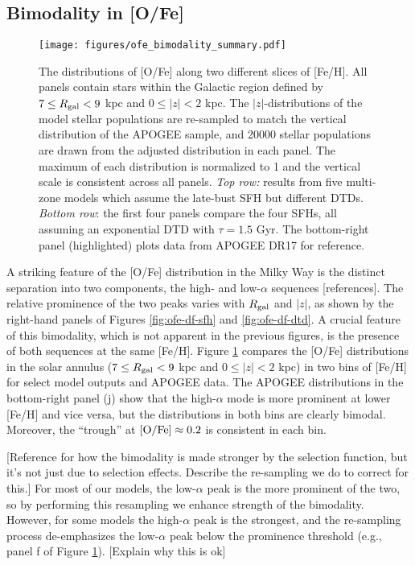\documentclass[twocolumn,twocolappendix,linenumbers,trackchanges]{aastex631}
\begin{document}
\subsection{Bimodality in [O/Fe]}
\label{sec:bimodality}

\begin{figure*}
    \centering
    \texttt{[image: figures/ofe\_bimodality\_summary.pdf]}
    \caption{The distributions of [O/Fe] along two different slices of [Fe/H]. 
    All panels contain stars within the Galactic region defined by $7\leq R_{\rm gal}<9$ kpc and $0\leq|z|<2$ kpc. The $|z|$-distributions of the model stellar populations are re-sampled to match the vertical distribution of the APOGEE sample, and \num{20000} stellar populations are drawn from the adjusted distribution in each panel. The maximum of each distribution is normalized to 1 and the vertical scale is consistent across all panels.
    \textit{Top row:} results from five multi-zone models which assume the late-bust SFH but different DTDs. \textit{Bottom row}: the first four panels compare the four SFHs, all assuming an exponential DTD with $\tau=1.5$ Gyr. The bottom-right panel (highlighted) plots data from APOGEE DR17 for reference.}
    \label{fig:ofe-bimodality}
\end{figure*}

A striking feature of the [O/Fe] distribution in the Milky Way is the distinct separation into two components, the high- and low-$\alpha$ sequences [references]. The relative prominence of the two peaks varies with $R_{\rm gal}$ and $|z|$, as shown by the right-hand panels of Figures \ref{fig:ofe-df-sfh} and \ref{fig:ofe-df-dtd}. A crucial feature of this bimodality, which is not apparent in the previous figures, is the presence of both sequences at the same [Fe/H]. Figure \ref{fig:ofe-bimodality} compares the [O/Fe] distributions in the solar annulus ($7\leq R_{\rm gal}<9$ kpc and $0\leq|z|<2$ kpc) in two bins of [Fe/H] for select model outputs and APOGEE data. The APOGEE distributions in the bottom-right panel (j) show that the high-$\alpha$ mode is more prominent at lower [Fe/H] and vice versa, but the distributions in both bins are clearly bimodal. Moreover, the ``trough'' at ${\rm [O/Fe]}\approx0.2$ is consistent in each bin.

[Reference \citet{Vincenzo2021-AlphaDistribution} for how the bimodality is made stronger by the selection function, but it's not just due to selection effects. Describe the re-sampling we do to correct for this.]
For most of our models, the low-$\alpha$ peak is the more prominent of the two, so by performing this resampling we enhance strength of the bimodality. However, for some models the high-$\alpha$ peak is the strongest, and the re-sampling process de-emphasizes the low-$\alpha$ peak below the prominence threshold (e.g., panel f of Figure \ref{fig:ofe-bimodality}). [Explain why this is ok]
\end{document}
